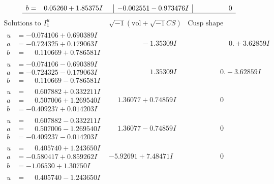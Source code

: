 \documentclass[1p]{elsarticle_modified}
\theoremstyle{definition}
\newcommand{\I}{\sqrt{-1}}
\begin{document}
$$\begin{array}{c|c|c}
\begin{aligned}
b &= \phantom{-}0.05260 + 1.85375 I\end{aligned}
 & -0.002551 - 0.973476 I & \phantom{-0.000000 } 0\\
 \hline 
 \end{array}$$\newpage$$\begin{array}{c|c|c}  
\text{Solutions to }I^u_{1}& \I (\text{vol} + \sqrt{-1}CS) & \text{Cusp shape}\\
 \hline 
\begin{aligned}
u &= -0.074106 + 0.690389 I \\
a &= -0.724325 + 0.179063 I \\
b &= \phantom{-}0.110669 + 0.786581 I\end{aligned}
 & \phantom{-0.000000 } -1.35309 I & \phantom{-0.000000 -}0. + 3.62859 I \\ \hline\begin{aligned}
u &= -0.074106 - 0.690389 I \\
a &= -0.724325 - 0.179063 I \\
b &= \phantom{-}0.110669 - 0.786581 I\end{aligned}
 & \phantom{-0.000000 -}1.35309 I & \phantom{-0.000000 } 0. - 3.62859 I \\ \hline\begin{aligned}
u &= \phantom{-}0.607882 + 0.332211 I \\
a &= \phantom{-}0.507006 + 1.269540 I \\
b &= -0.409237 + 0.014203 I\end{aligned}
 & \phantom{-}1.36077 + 0.74859 I & \phantom{-0.000000 } 0 \\ \hline\begin{aligned}
u &= \phantom{-}0.607882 - 0.332211 I \\
a &= \phantom{-}0.507006 - 1.269540 I \\
b &= -0.409237 - 0.014203 I\end{aligned}
 & \phantom{-}1.36077 - 0.74859 I & \phantom{-0.000000 } 0 \\ \hline\begin{aligned}
u &= \phantom{-}0.405740 + 1.243650 I \\
a &= -0.580417 + 0.859262 I \\
b &= -1.06530 + 1.30750 I\end{aligned}
 & -5.92691 + 7.48471 I & \phantom{-0.000000 } 0 \\ \hline\begin{aligned}
u &= \phantom{-}0.405740 - 1.243650 I \\

\end{aligned}
\end{array}$$
\end{document}
